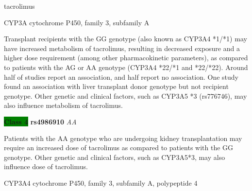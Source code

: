 \documentclass{resume} %
\begin{document}
\begin{rSection}{ tacrolimus }
\begin{rSubsection}{ CYP3A }{ cytochrome P450, family 3, subfamily A }{}{}
\item[] Transplant recipients with the GG genotype (also known as CYP3A4 *1/*1) may have increased metabolism of tacrolimus, resulting in decreased exposure and a higher dose requirement (among other pharmacokinetic parameters), as compared to patients with the AG or AA genotype (CYP3A4 *22/*1 and *22/*22). Around half of studies report an association, and half report no association. One study found an association with liver transplant donor genotype but not recipient genotype. Other genetic and clinical factors, such as CYP3A5 *3 (rs776746), may also influence metabolism of tacrolimus.\item \textbf{\colorbox{green} {Class 4}} \textbf{ rs4986910 } \textit{ AA }
\item[] Patients with the AA genotype who are undergoing kidney transplantation may require an increased dose of tacrolimus as compared to patients with the GG genotype. Other genetic and clinical factors, such as CYP3A5*3, may also influence dose of tacrolimus.
\end{rSubsection}\begin{rSubsection}{ CYP3A4 }{ cytochrome P450, family 3, subfamily A, polypeptide 4 }{}{}
\item[]


\end{rSubsection}
\end{rSection}
\end{document}
